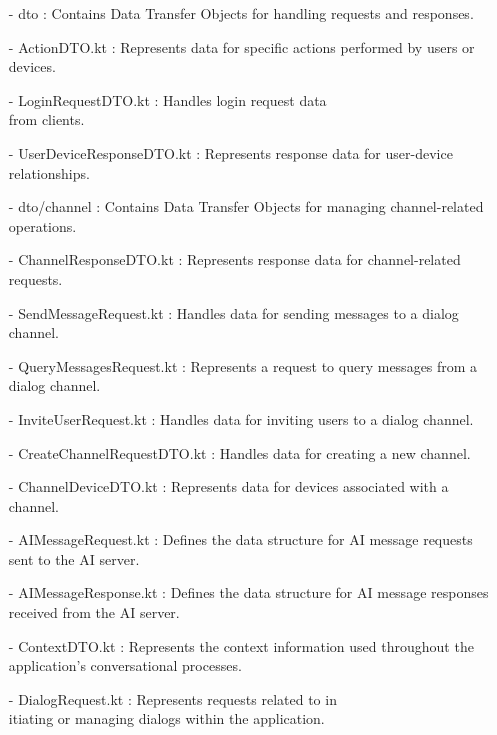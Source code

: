 \documentclass[conference]{IEEEtran}
\begin{document}
\begin{enumerate}
        \item[-] dto : Contains Data Transfer Objects for handling requests and responses.\\
        \item[-] ActionDTO.kt : Represents data for specific actions performed by users or devices. \\
        \item[-] LoginRequestDTO.kt : Handles login request data\\ from clients.\\
        \item[-] UserDeviceResponseDTO.kt : Represents response data for user-device relationships.\\
        
        
        \item[-] dto/channel : Contains Data Transfer Objects for managing channel-related operations.\\
        \item[-] ChannelResponseDTO.kt : Represents response data for channel-related requests.\\
        \item[-] SendMessageRequest.kt : Handles data for sending messages to a dialog channel. \\
        \item[-] QueryMessagesRequest.kt : Represents a request to query messages from a dialog channel.\\
        \item[-] InviteUserRequest.kt : Handles data for inviting users to a dialog channel.\\
        \item[-] CreateChannelRequestDTO.kt : Handles data for creating a new channel. \\
        \item[-] ChannelDeviceDTO.kt : Represents data for devices associated with a channel.\\

        \item[-] AIMessageRequest.kt : Defines the data structure for AI message requests sent to the AI server.\\
        \item[-] AIMessageResponse.kt : Defines the data structure for AI message responses received from the AI server. \\
        \item[-] ContextDTO.kt : Represents the context information used throughout the application's conversational processes.\\
        \item[-] DialogRequest.kt : Represents requests related to in\\itiating or managing dialogs within the application. \\
        

\end{enumerate}
\end{document}
